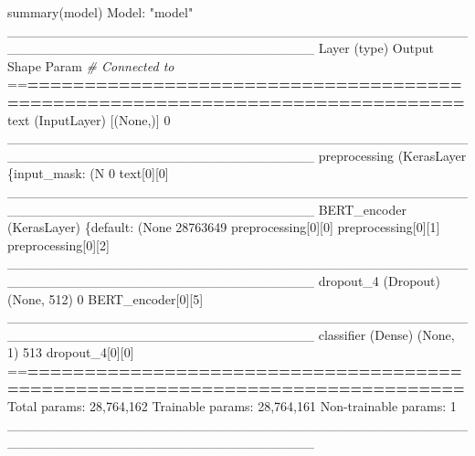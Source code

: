 \documentclass[
]{article}
\newenvironment{Shaded}{}{}
\newcommand{\CommentTok}[1]{\textcolor[rgb]{0.38,0.63,0.69}{\textit{#1}}}
\newcommand{\DecValTok}[1]{\textcolor[rgb]{0.25,0.63,0.44}{#1}}
\newcommand{\ErrorTok}[1]{\textcolor[rgb]{1.00,0.00,0.00}{\textbf{#1}}}
\newcommand{\FunctionTok}[1]{\textcolor[rgb]{0.02,0.16,0.49}{#1}}
\newcommand{\NormalTok}[1]{#1}
\newcommand{\SpecialCharTok}[1]{\textcolor[rgb]{0.25,0.44,0.63}{#1}}
\newcommand{\StringTok}[1]{\textcolor[rgb]{0.25,0.44,0.63}{#1}}
\begin{document}
\begin{Shaded}
\begin{Highlighting}[]
\FunctionTok{summary}\NormalTok{(model)}
\NormalTok{Model}\SpecialCharTok{:} \StringTok{"model"}
\NormalTok{\_\_\_\_\_\_\_\_\_\_\_\_\_\_\_\_\_\_\_\_\_\_\_\_\_\_\_\_\_\_\_\_\_\_\_\_\_\_\_\_\_\_\_\_\_\_\_\_\_\_\_\_\_\_\_\_\_\_\_\_\_\_\_\_\_\_\_\_\_\_\_\_\_\_\_\_\_\_\_\_}
\FunctionTok{Layer}\NormalTok{ (type)              Output Shape      Param }\CommentTok{\#  Connected to               }
\SpecialCharTok{==}\ErrorTok{==============================================================================}
\FunctionTok{text}\NormalTok{ (InputLayer)         [(None,)]         }\DecValTok{0}                                   
\NormalTok{\_\_\_\_\_\_\_\_\_\_\_\_\_\_\_\_\_\_\_\_\_\_\_\_\_\_\_\_\_\_\_\_\_\_\_\_\_\_\_\_\_\_\_\_\_\_\_\_\_\_\_\_\_\_\_\_\_\_\_\_\_\_\_\_\_\_\_\_\_\_\_\_\_\_\_\_\_\_\_\_}
\FunctionTok{preprocessing}\NormalTok{ (KerasLayer \{}\StringTok{\textquotesingle{}input\_mask\textquotesingle{}}\SpecialCharTok{:}\NormalTok{ (N }\DecValTok{0}\NormalTok{        text[}\DecValTok{0}\NormalTok{][}\DecValTok{0}\NormalTok{]                 }
\NormalTok{\_\_\_\_\_\_\_\_\_\_\_\_\_\_\_\_\_\_\_\_\_\_\_\_\_\_\_\_\_\_\_\_\_\_\_\_\_\_\_\_\_\_\_\_\_\_\_\_\_\_\_\_\_\_\_\_\_\_\_\_\_\_\_\_\_\_\_\_\_\_\_\_\_\_\_\_\_\_\_\_}
\FunctionTok{BERT\_encoder}\NormalTok{ (KerasLayer) \{}\StringTok{\textquotesingle{}default\textquotesingle{}}\SpecialCharTok{:}\NormalTok{ (None }\DecValTok{28763649}\NormalTok{ preprocessing[}\DecValTok{0}\NormalTok{][}\DecValTok{0}\NormalTok{]        }
\NormalTok{                                                     preprocessing[}\DecValTok{0}\NormalTok{][}\DecValTok{1}\NormalTok{]        }
\NormalTok{                                                     preprocessing[}\DecValTok{0}\NormalTok{][}\DecValTok{2}\NormalTok{]        }
\NormalTok{\_\_\_\_\_\_\_\_\_\_\_\_\_\_\_\_\_\_\_\_\_\_\_\_\_\_\_\_\_\_\_\_\_\_\_\_\_\_\_\_\_\_\_\_\_\_\_\_\_\_\_\_\_\_\_\_\_\_\_\_\_\_\_\_\_\_\_\_\_\_\_\_\_\_\_\_\_\_\_\_}
\FunctionTok{dropout\_4}\NormalTok{ (Dropout)       (None, }\DecValTok{512}\NormalTok{)       }\DecValTok{0}\NormalTok{        BERT\_encoder[}\DecValTok{0}\NormalTok{][}\DecValTok{5}\NormalTok{]         }
\NormalTok{\_\_\_\_\_\_\_\_\_\_\_\_\_\_\_\_\_\_\_\_\_\_\_\_\_\_\_\_\_\_\_\_\_\_\_\_\_\_\_\_\_\_\_\_\_\_\_\_\_\_\_\_\_\_\_\_\_\_\_\_\_\_\_\_\_\_\_\_\_\_\_\_\_\_\_\_\_\_\_\_}
\FunctionTok{classifier}\NormalTok{ (Dense)        (None, }\DecValTok{1}\NormalTok{)         }\DecValTok{513}\NormalTok{      dropout\_4[}\DecValTok{0}\NormalTok{][}\DecValTok{0}\NormalTok{]            }
\SpecialCharTok{==}\ErrorTok{==============================================================================}
\NormalTok{Total params}\SpecialCharTok{:} \DecValTok{28}\NormalTok{,}\DecValTok{764}\NormalTok{,}\DecValTok{162}
\NormalTok{Trainable params}\SpecialCharTok{:} \DecValTok{28}\NormalTok{,}\DecValTok{764}\NormalTok{,}\DecValTok{161}
\NormalTok{Non}\SpecialCharTok{{-}}\NormalTok{trainable params}\SpecialCharTok{:} \DecValTok{1}
\NormalTok{\_\_\_\_\_\_\_\_\_\_\_\_\_\_\_\_\_\_\_\_\_\_\_\_\_\_\_\_\_\_\_\_\_\_\_\_\_\_\_\_\_\_\_\_\_\_\_\_\_\_\_\_\_\_\_\_\_\_\_\_\_\_\_\_\_\_\_\_\_\_\_\_\_\_\_\_\_\_\_\_}
\end{Highlighting}
\end{Shaded}
\end{document}
